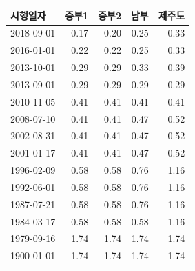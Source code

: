\begin{defaulttable}
  \caption{\texttt{unknown} 최하층 바닥에 적용되는 열관류율
    $[\mathrm{W/(m^2K)}]$}
  \label{tbl:unknown-db-groundfloor}
  {\small
  \renewcommand{\arraystretch}{1.05}
  \begin{tabular}{lrrrr}
    \toprule
    시행일자 & 중부1 & 중부2 & 남부 & 제주도 \\ \midrule
    2018-09-01 & 0.17 & 0.20 & 0.25 & 0.33 \\
    2016-01-01 & 0.22 & 0.22 & 0.25 & 0.33 \\
    2013-10-01 & 0.29 & 0.29 & 0.33 & 0.39 \\
    2013-09-01 & 0.29 & 0.29 & 0.29 & 0.29 \\
    2010-11-05 & 0.41 & 0.41 & 0.41 & 0.41 \\
    2008-07-10 & 0.41 & 0.41 & 0.47 & 0.52 \\
    2002-08-31 & 0.41 & 0.41 & 0.47 & 0.52 \\
    2001-01-17 & 0.41 & 0.41 & 0.47 & 0.52 \\
    1996-02-09 & 0.58 & 0.58 & 0.76 & 1.16 \\
    1992-06-01 & 0.58 & 0.58 & 0.76 & 1.16 \\
    1987-07-21 & 0.58 & 0.58 & 0.76 & 1.16 \\
    1984-03-17 & 0.58 & 0.58 & 0.58 & 1.16 \\
    1979-09-16 & 1.74 & 1.74 & 1.74 & 1.74 \\
    1900-01-01 & 1.74 & 1.74 & 1.74 & 1.74 \\
    \bottomrule
  \end{tabular}
  }
\end{defaulttable}

